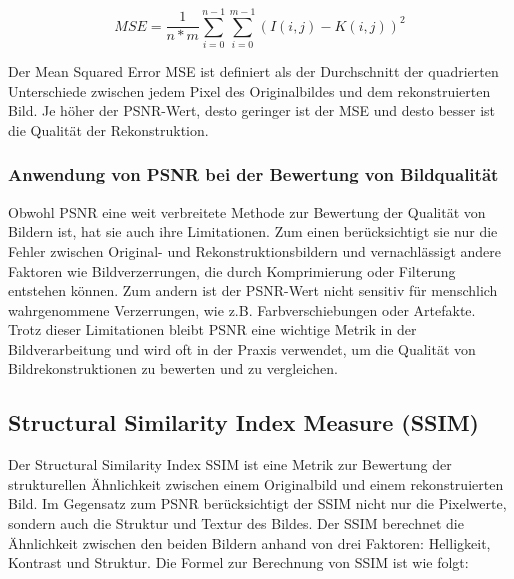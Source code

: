 
            \begin{equation}
                MSE = \frac{1}{n*m} \sum_{i=0}^{n-1} \sum_{i=0}^{m-1} (I(i,j) - K(i,j))^2
            \end{equation}
            
            Der Mean Squared Error \ac{MSE} ist definiert als der Durchschnitt der quadrierten Unterschiede zwischen jedem Pixel des Originalbildes und dem rekonstruierten Bild.
            Je höher der PSNR-Wert, desto geringer ist der \ac{MSE} und desto besser ist die Qualität der Rekonstruktion.
            
        \subsubsection{Anwendung von \ac{PSNR} bei der Bewertung von Bildqualität}
            Obwohl \ac{PSNR} eine weit verbreitete Methode zur Bewertung der Qualität von Bildern ist, hat sie auch ihre Limitationen.
            Zum einen berücksichtigt sie nur die Fehler zwischen Original- und Rekonstruktionsbildern und vernachlässigt andere Faktoren wie Bildverzerrungen, die durch Komprimierung oder Filterung entstehen können.
            Zum andern ist der \ac{PSNR}-Wert nicht sensitiv für menschlich wahrgenommene Verzerrungen, wie z.B. Farbverschiebungen oder Artefakte.
            Trotz dieser Limitationen bleibt \ac{PSNR} eine wichtige Metrik in der Bildverarbeitung und wird oft in der Praxis verwendet, um die Qualität von Bildrekonstruktionen zu bewerten und zu vergleichen.
    \subsection{Structural Similarity Index Measure (SSIM)}

        Der Structural Similarity Index \ac{SSIM} ist eine Metrik zur Bewertung der strukturellen Ähnlichkeit zwischen einem Originalbild und einem rekonstruierten Bild. 
        Im Gegensatz zum PSNR berücksichtigt der \ac{SSIM} nicht nur die Pixelwerte, sondern auch die Struktur und Textur des Bildes. 
        Der \ac{SSIM} berechnet die Ähnlichkeit zwischen den beiden Bildern anhand von drei Faktoren: Helligkeit, Kontrast und Struktur. Die Formel zur Berechnung von \ac{SSIM} ist wie folgt:
        
